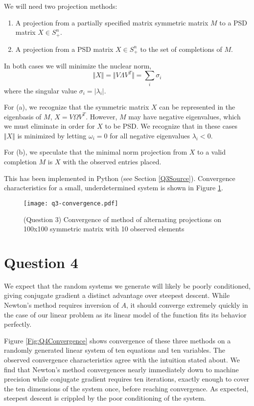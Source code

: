 \documentclass{article}
\begin{document}
We will need two projection methods:

\begin{enumerate}
\item A projection from a partially specified matrix symmetric matrix $M$
  to a PSD matrix $X \in S_+^n$.
\item A projection from a PSD matrix $X \in S_+^n$ to the set of
  completions of $M$.
\end{enumerate}

In both cases we will minimize the nuclear norm,
\[ \Vert X \Vert = \Vert V \Lambda V^T \Vert = \sum_i \sigma_i \]
where the singular value $\sigma_i = \vert \lambda_i \vert$.

For (a), we recognize that the symmetric matrix $X$ can be represented
in the eigenbasis of $M$, $X = V \Omega V^T$. However, $M$ may have
negative eigenvalues, which we must eliminate in order for $X$ to be
PSD. We recognize that in these cases $\Vert X \Vert$ is minimized by
letting $\omega_i = 0$ for all negative eigenvalues $\lambda_i <
0$.

For (b), we speculate that the minimal norm projection from $X$ to a
valid completion $M$ is $X$ with the observed entries placed.

This has been implemented in Python (see Section
\ref{Q3Source}). Convergence characteristics for a small,
underdetermined system is shown in Figure \ref{Fig:AltProjConv}.

\begin{figure}
  \center
  \texttt{[image: q3-convergence.pdf]}
  \caption{(Question 3) Convergence of method of alternating projections on 100x100
  symmetric matrix with 10 observed elements}
  \label{Fig:AltProjConv}
\end{figure}

\section{Question 4}

We expect that the random systems we generate will likely be poorly
conditioned, giving conjugate gradient a distinct advantage over
steepest descent. While Newton's method requires inversion of $A$, it
should converge extremely quickly in the case of our linear problem as
its linear model of the function fits its behavior perfectly.

Figure \ref{Fig:Q4Convergence} shows convergence of these three methods on
a randomly generated linear system of ten equations and ten
variables. The observed convergence characteristics agree with the
intuition stated about. We find that Newton's method convergences
nearly immediately down to machine precision while conjugate gradient
requires ten iterations, exactly enough to cover the ten dimensions of
the system once, before reaching convergence. As expected, steepest
descent is crippled by the poor conditioning of the system.
\end{document}
